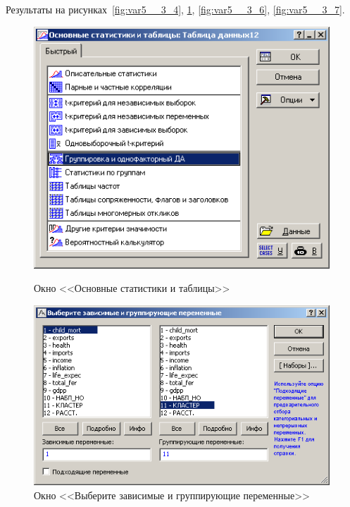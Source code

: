 Результаты на рисунках~\ref{fig:var5__3_4}, \ref{fig:var5__3_5}, \ref{fig:var5__3_6}, \ref{fig:var5__3_7}.

\begin{figure}[!h]
  \centering
  \begin{minipage}{0.49\textwidth}
    \centering

    \includegraphics[width=0.99\textwidth]
    {inc/cars_my/var5__3_4.PNG}

    \caption{Окно <<Основные статистики и таблицы>>}
    \label{fig:var5__3_4}
  \end{minipage}
  \begin{minipage}{0.49\textwidth}
    \centering

    \includegraphics[width=0.99\textwidth]
    {inc/cars_my/var5__3_5.PNG}

    \caption{Окно <<Выберите зависимые и группирующие переменные>>}
    \label{fig:var5__3_5}
  \end{minipage}
\end{figure}

